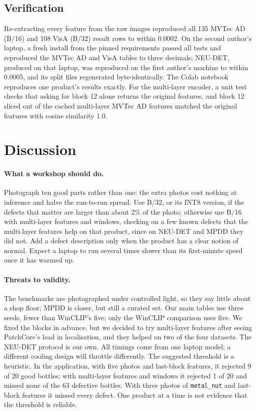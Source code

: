 \documentclass[10pt,twocolumn]{article}
\begin{document}
\subsection{Verification}
Re-extracting every feature from the raw images reproduced all 135 MVTec AD
(B/16) and 108 VisA (B/32) result rows to within 0.0002. On the second author's
laptop, a fresh install from the pinned requirements passed all tests and
reproduced the MVTec AD and VisA tables to three decimals; NEU-DET, produced on
that laptop, was reproduced on the first author's machine to within 0.0005, and
its split files regenerated byte-identically. The Colab notebook reproduces one
product's results exactly. For the multi-layer encoder, a unit test checks that
asking for block 12 alone returns the original features, and block 12 sliced out
of the cached multi-layer MVTec AD features matched the original features with
cosine similarity 1.0.

\section{Discussion}

\paragraph{What a workshop should do.} Photograph ten good parts rather than one:
the extra photos cost nothing at inference and halve the run-to-run spread. Use
B/32, or its INT8 version, if the defects that matter are larger than about 2\%
of the photo; otherwise use B/16 with multi-layer features and windows, checking
on a few known defects that the multi-layer features help on that product, since
on NEU-DET and MPDD they did not. Add a defect description only when
the product has a clear notion of normal. Expect a laptop to run several times
slower than its first-minute speed once it has warmed up.

\paragraph{Threats to validity.} The benchmarks are photographed under controlled
light, so they say little about a shop floor; MPDD is closer, but still a
curated set. Our main tables use three seeds, fewer than WinCLIP's five; only the
WinCLIP comparison uses five. We fixed the blocks in advance, but we decided to try
multi-layer features after seeing PatchCore's lead in localisation, and they
helped on two of the four datasets. The NEU-DET protocol is our own. All timings come from one laptop
model; a different cooling design will throttle differently. The suggested
threshold is a heuristic. In the application, with five photos and last-block
features, it rejected 9 of 20 good bottles; with multi-layer features and windows
it rejected 1 of 20 and missed none of the 63 defective bottles. With three photos
of \texttt{metal\_nut} and last-block features it missed every defect. One product
at a time is not evidence that the threshold is reliable.
\end{document}
